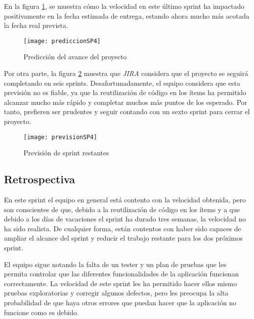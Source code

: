En la figura \ref{fig:prediccionSP4}, se muestra cómo la velocidad en este último sprint ha impactado positivamente en la fecha estimada de entrega, estando ahora mucho más acotada la fecha real prevista.

\begin{figure}[!h]
\begin{center}
\texttt{[image: prediccionSP4]}
\caption{Predicción del avance del proyecto}
\label{fig:prediccionSP4}
\end{center}
\end{figure}

Por otra parte, la figura \ref{fig:previsionSP4} muestra que \emph{JIRA} considera que el proyecto se seguirá completando en seis sprints. Desafortunadamente, el equipo considera que esta previsión no es fiable, ya que la reutilización de código en los ítems ha permitido alcanzar mucho más rápido y completar muchos más puntos de los esperado. Por tanto, prefieren ser prudentes y seguir contando con un sexto sprint para cerrar el proyecto.

\begin{figure}[!h]
\begin{center}
\texttt{[image: previsionSP4]}
\caption{Previsión de sprint restantes}
\label{fig:previsionSP4}
\end{center}
\end{figure}

\subsection{Retrospectiva}
\label{subsec:S4-Retrospectiva}

En este sprint el equipo en general está contento con la velocidad obtenida, pero son conscientes de que, debido a la reutilización de código en los ítems y a que debido a los días de vacaciones el sprint ha durado tres semanas, la velocidad no ha sido realista. De cualquier forma, están contentos con haber sido capaces de ampliar el alcance del sprint y reducir el trabajo restante para los dos próximos sprint.

El equipo sigue notando la falta de un tester y un plan de pruebas que les permita controlar que las diferentes funcionalidades de la aplicación funcionan correctamente. La velocidad de este sprint les ha permitido hacer ellos mismo pruebas exploratorias y corregir algunos defectos, pero les preocupa la alta probabilidad de que haya otros errores que puedan hacer que la aplicación no funcione como es debido.

